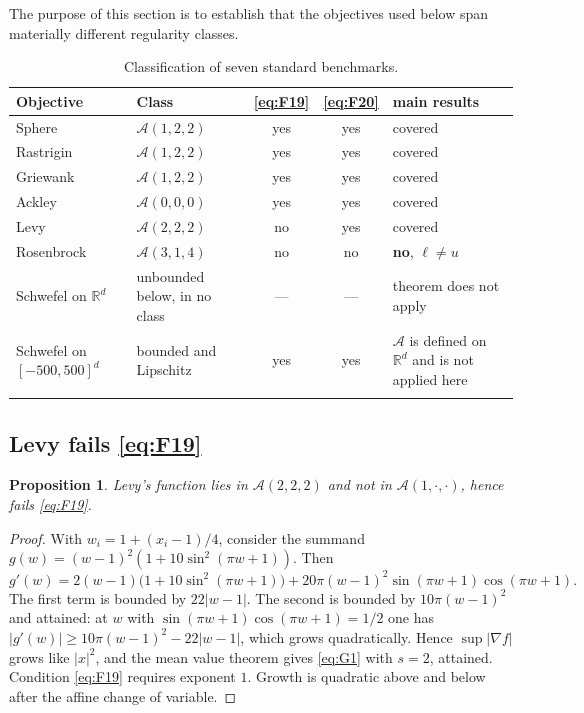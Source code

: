 \documentclass[pdflatex,sn-mathphys-num]{sn-jnl}
\theoremstyle{thmstyleone}
\newtheorem{proposition}[theorem]{Proposition}
\theoremstyle{thmstyletwo}
\theoremstyle{thmstylethree}
\begin{document}
The purpose of this section is to establish that the objectives used below span materially different regularity classes.

\begin{table}[h]
\caption{Classification of seven standard benchmarks.}\label{tab:class}
\begin{tabular}{@{}p{2.6cm}p{2.9cm}ccp{3.1cm}@{}}
\toprule
Objective & Class & \eqref{eq:F19} & \eqref{eq:F20} & \cite{ghv2025} main results\\
\midrule
Sphere & $\mathcal A(1,2,2)$ & yes & yes & covered\\
Rastrigin & $\mathcal A(1,2,2)$ & yes & yes & covered\\
Griewank & $\mathcal A(1,2,2)$ & yes & yes & covered\\
Ackley & $\mathcal A(0,0,0)$ & yes & yes & covered\\
Levy & $\mathcal A(2,2,2)$ & no & yes & covered\\
Rosenbrock & $\mathcal A(3,1,4)$ & no & no & \textbf{no}, $\ell\ne u$\\
Schwefel on $\mathbb R^d$ & unbounded below, in no class & --- & --- & theorem does not apply\\
Schwefel on $[-500,500]^d$ & bounded and Lipschitz & yes & yes & $\mathcal A$ is defined on $\mathbb R^d$ and is not applied here\\
\botrule
\end{tabular}
\end{table}

\subsection{Levy fails \eqref{eq:F19}}\label{sec:levy}

\begin{proposition}
Levy's function lies in $\mathcal A(2,2,2)$ and not in $\mathcal A(1,\cdot,\cdot)$, hence fails \eqref{eq:F19}.
\end{proposition}

\begin{proof}
With $w_i=1+(x_i-1)/4$, consider the summand $g(w)=(w-1)^2(1+10\sin^2(\pi w+1))$. Then
\[
g'(w)=2(w-1)\bigl(1+10\sin^2(\pi w+1)\bigr)+20\pi (w-1)^2\sin(\pi w+1)\cos(\pi w+1).
\]
The first term is bounded by $22|w-1|$. The second is bounded by $10\pi(w-1)^2$ and attained: at $w$ with $\sin(\pi w+1)\cos(\pi w+1)=1/2$ one has $|g'(w)|\ge 10\pi(w-1)^2-22|w-1|$, which grows quadratically. Hence $\sup|\nabla f|$ grows like $|x|^2$, and the mean value theorem gives \eqref{eq:G1} with $s=2$, attained. Condition \eqref{eq:F19} requires exponent $1$. Growth is quadratic above and below after the affine change of variable.
\end{proof}
\end{document}
